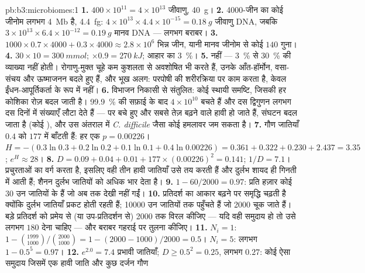 \begin{solution}{pb:b3:microbiomes:1}
\textbf{1.} $400\times 10^{11} = 4\times 10^{13}$ जीवाणु, \qty{40}{g}।
\textbf{2.} \num{4000}-जीन का कोई जीनोम लगभग \qty{4}{Mb} है, \qty{4.4}{fg}:
$4\times 10^{13}\times 4.4\times 10^{-15} = \qty{0.18}{g}$ जीवाणु
DNA, जबकि $3\times 10^{13}\times 6.4\times 10^{-12} = \qty{0.19}{g}$
मानव DNA --- लगभग बराबर।
\textbf{3.} $1000\times 0.7\times 4000 + 0.3\times 4000 \approx 2.8\times
10^{6}$ भिन्न जीन, यानी मानव जीनोम से कोई $140$ गुना।
\textbf{4.} $30\times 10 = \qty{300}{mmol}$; $\times 0.9 = \qty{270}{kJ}$;
आहार का \qty{3}{\%}।
\textbf{5.} नहीं --- \qty{3}{\%} से \qty{30}{\%} की व्याख्या नहीं
होती। रोगाणु-मुक्त चूहे कम कुशलता से अवशोषित भी करते हैं, उनके
आँत-हॉर्मोन, वसा-संचय और ऊष्माजनन बदले हुए हैं, और भूख अलग:
 परपोषी की शरीरक्रिया पर काम करता है, केवल
ईंधन-आपूर्तिकर्ता के रूप में नहीं।
\textbf{6.} विभाजन निकासी से संतुलित: कोई स्थायी समष्टि, जिसकी हर
कोशिका रोज़ बदल जाती है। \qty{99.9}{\%} की सफ़ाई के बाद
$4\times 10^{10}$ बचते हैं और दस द्विगुणन लगभग दस दिनों में संख्याएँ
लौटा देते हैं --- पर बचे हुए और सबसे तेज़ बढ़ने वाले हावी हो जाते हैं,
संघटन बदल जाता है (कोई ), और उस अंतराल में \emph{C.
difficile} जैसा कोई हमलावर जम सकता है।
\textbf{7.} गौण जातियाँ $0.4$ को $177$ में बाँटती हैं: हर एक $p = 0.00226$। $H
= -(0.3\ln 0.3 + 0.2\ln 0.2 + 0.1\ln 0.1 + 0.4\ln 0.00226) = 0.361 +
0.322 + 0.230 + 2.437 = 3.35$; $e^{H} \approx 28$।
\textbf{8.} $D = 0.09 + 0.04 + 0.01 + 177\times (0.00226)^{2} = 0.141$;
$1/D = 7.1$।  प्रचुरताओं का वर्ग करता है, इसलिए वही तीन
हावी जातियाँ उसे तय करती हैं और दुर्लभ शायद ही गिनती में आती हैं;
शैनन दुर्लभ जातियों को अधिक भार देता है।
\textbf{9.} $1 - 60/2000 = 0.97$: प्रति हज़ार कोई $30$  उन जातियों
के हैं जो अब तक देखी नहीं गईं।
\textbf{10.} प्रतिदर्श का आकार बढ़ने पर समृद्धि चढ़ती है क्योंकि दुर्लभ
जातियाँ प्रकट होती रहती हैं; \num{10000}  उन जातियों तक पहुँचते हैं
जो \num{2000} चूक जाते हैं। बड़े प्रतिदर्श को प्रमेय से (या
उप-प्रतिदर्शन से) \num{2000}  तक विरल कीजिए --- यदि वही समुदाय
हो तो उसे लगभग $180$ देना चाहिए --- और बराबर गहराई पर तुलना कीजिए।
\textbf{11.} $N_{i} = 1$: $1 - \binom{1999}{1000}/\binom{2000}{1000} =
1 - (2000 - 1000)/2000 = 0.5$। $N_{i} = 5$: लगभग $1 - 0.5^{5} = 0.97$।
\textbf{12.} $e^{2.0} = 7.4$ प्रभावी जातियाँ; $D \ge 0.5^{2} = 0.25$,
लगभग $0.27$: कोई ऐसा समुदाय जिसमें एक हावी जाति और कुछ दर्जन गौण

\end{solution}
